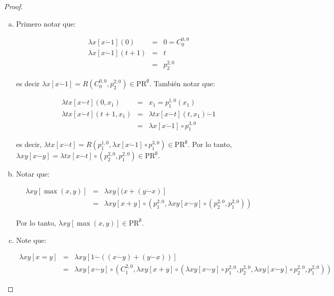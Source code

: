   \begin{proof}
    \begin{enumerate}[a)]
      \item Primero notar que:

        \begin{eqnarray*}
          \lambda x \left[x \dot{-}1\right](0) &=& 0 = C_{0}^{0,0} \\
          \lambda x \left[x \dot{-}1\right](t+1) &=& t \\
          &=& p_{2}^{2,0}
        \end{eqnarray*}

        \PN es decir $\lambda x \left[x \dot{-}1\right] = R(C_{0}^{0,0}, p_{2}^{2,0}) \in \mathrm{PR}^{\emptyset}$.
        \PN También notar que:

        \begin{eqnarray*}
          \lambda tx \left[x \dot{-}t\right](0, x_{1}) &=& x_{1} = p_{1}^{1,0}(x_{1}) \\
          \lambda tx \left[x \dot{-}t\right](t+1, x_{1}) &=& \lambda tx \left[x \dot{-}t\right](t, x_{1})
            \dot{-} 1\\
          &=& \lambda x \left[x \dot{-}1\right] \circ p_{1}^{3,0}
        \end{eqnarray*}

        \PN es decir, $\lambda tx \left[x \dot{-}t\right] = R(p_{1}^{1, 0}, \lambda x \left[x \dot{-}1\right] \circ
        p_{1}^{3, 0}) \in \mathrm{PR}^{\emptyset}$. Por lo tanto, $\lambda xy \left[x \dot{-}y\right] = \lambda tx
        \left[x \dot{-}t\right] \circ (p_{2}^{2, 0}, p_{1}^{2, 0}) \in \mathrm{PR}^{\emptyset}$.

      \item Notar que:

        \begin{eqnarray*}
          \lambda xy \left[\max (x,y)\right] &=& \lambda xy \left[(x + (y \dot{-}x)\right] \\
          &=& \lambda xy \left[x+y\right] \circ \left(p_{1}^{2,0}, \lambda xy \left[x \dot{-}y\right] \circ
            (p_{2}^{2,0}, p_{1}^{2,0})\right)
        \end{eqnarray*}

        \PN Por lo tanto, $\lambda xy \left[\max (x,y)\right] \in \mathrm{PR}^{\emptyset}$.

      \item Note que:

        \begin{eqnarray*}
          \lambda xy \left[x=y\right] &=& \lambda xy \left[1 \dot{-}((x \dot{-} y) + (y \dot{-} x))\right] \\
          &=& \lambda xy \left[x \dot{-}y\right] \circ (C_{1}^{2,0}, \lambda xy \left[x+y\right] \circ
            (\lambda xy \left[x \dot{-}y\right] \circ p_{1}^{2,0}, p_{2}^{2,0}, \lambda xy \left[x \dot{-}y\right] \circ
            p_{2}^{2,0}, p_{1}^{2,0}))
        \end{eqnarray*}


\end{enumerate}
\end{proof}
